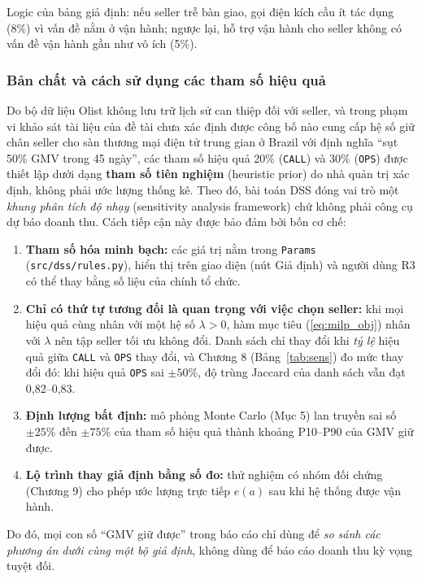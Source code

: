Logic của bảng giả định: nếu seller trễ bàn giao, gọi điện kích cầu ít tác dụng (8\%) vì vấn đề nằm ở vận hành; ngược lại, hỗ trợ vận hành cho seller không có vấn đề vận hành gần như vô ích (5\%).

\subsubsection*{Bản chất và cách sử dụng các tham số hiệu quả}
Do bộ dữ liệu Olist không lưu trữ lịch sử can thiệp đối với seller, và trong phạm vi khảo sát tài liệu của đề tài chưa xác định được công bố nào cung cấp hệ số giữ chân seller cho sàn thương mại điện tử trung gian ở Brazil với định nghĩa ``sụt 50\% GMV trong 45 ngày'', các tham số hiệu quả 20\% (\texttt{CALL}) và 30\% (\texttt{OPS}) được thiết lập dưới dạng \textbf{tham số tiên nghiệm} (heuristic prior) do nhà quản trị xác định, không phải ước lượng thống kê. Theo đó, bài toán DSS đóng vai trò một \emph{khung phân tích độ nhạy} (sensitivity analysis framework) chứ không phải công cụ dự báo doanh thu. Cách tiếp cận này được bảo đảm bởi bốn cơ chế:
\begin{enumerate}
    \item \textbf{Tham số hóa minh bạch:} các giá trị nằm trong \texttt{Params} (\texttt{src/dss/rules.py}), hiển thị trên giao diện (nút Giả định) và người dùng R3 có thể thay bằng số liệu của chính tổ chức.
    \item \textbf{Chỉ có thứ tự tương đối là quan trọng với việc chọn seller:} khi mọi hiệu quả cùng nhân với một hệ số $\lambda > 0$, hàm mục tiêu (\ref{eq:milp_obj}) nhân với $\lambda$ nên tập seller tối ưu không đổi. Danh sách chỉ thay đổi khi \emph{tỷ lệ} hiệu quả giữa \texttt{CALL} và \texttt{OPS} thay đổi, và Chương 8 (Bảng~\ref{tab:sens}) đo mức thay đổi đó: khi hiệu quả \texttt{OPS} sai $\pm 50\%$, độ trùng Jaccard của danh sách vẫn đạt 0,82--0,83.
    \item \textbf{Định lượng bất định:} mô phỏng Monte Carlo (Mục 5) lan truyền sai số $\pm 25\%$ đến $\pm 75\%$ của tham số hiệu quả thành khoảng P10--P90 của GMV giữ được.
    \item \textbf{Lộ trình thay giả định bằng số đo:} thử nghiệm có nhóm đối chứng (Chương 9) cho phép ước lượng trực tiếp $e(a)$ sau khi hệ thống được vận hành.
\end{enumerate}
Do đó, mọi con số ``GMV giữ được'' trong báo cáo chỉ dùng để \emph{so sánh các phương án dưới cùng một bộ giả định}, không dùng để báo cáo doanh thu kỳ vọng tuyệt đối.

